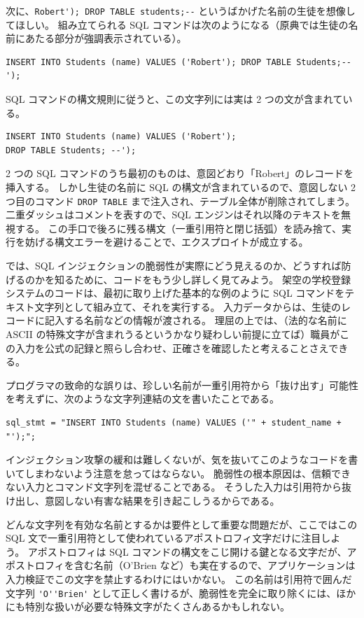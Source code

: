 \documentclass[uplatex]{jsarticle}
\begin{document}
次に、\verb|Robert'); DROP TABLE students;--| というばかげた名前の生徒を想像してほしい。
組み立てられる SQL コマンドは次のようになる（原典では生徒の名前にあたる部分が強調表示されている）。
\begin{verbatim}
INSERT INTO Students (name) VALUES ('Robert'); DROP TABLE Students;--');
\end{verbatim}
SQL コマンドの構文規則に従うと、この文字列には実は 2 つの文が含まれている。
\begin{verbatim}
INSERT INTO Students (name) VALUES ('Robert');
DROP TABLE Students; --');
\end{verbatim}
2 つの SQL コマンドのうち最初のものは、意図どおり「Robert」のレコードを挿入する。
しかし生徒の名前に SQL の構文が含まれているので、意図しない 2 つ目のコマンド \texttt{DROP TABLE} まで注入され、テーブル全体が削除されてしまう。
二重ダッシュはコメントを表すので、SQL エンジンはそれ以降のテキストを無視する。
この手口で後ろに残る構文（一重引用符と閉じ括弧）を読み捨て、実行を妨げる構文エラーを避けることで、エクスプロイトが成立する。

では、SQL インジェクションの脆弱性が実際にどう見えるのか、どうすれば防げるのかを知るために、コードをもう少し詳しく見てみよう。
架空の学校登録システムのコードは、最初に取り上げた基本的な例のように SQL コマンドをテキスト文字列として組み立て、それを実行する。
入力データからは、生徒のレコードに記入する名前などの情報が渡される。
理屈の上では、（法的な名前に ASCII の特殊文字が含まれうるというかなり疑わしい前提に立てば）職員がこの入力を公式の記録と照らし合わせ、正確さを確認したと考えることさえできる。

プログラマの致命的な誤りは、珍しい名前が一重引用符から「抜け出す」可能性を考えずに、次のような文字列連結の文を書いたことである。
\begin{verbatim}
sql_stmt = "INSERT INTO Students (name) VALUES ('" + student_name + "');";
\end{verbatim}
インジェクション攻撃の緩和は難しくないが、気を抜いてこのようなコードを書いてしまわないよう注意を怠ってはならない。
脆弱性の根本原因は、信頼できない入力とコマンド文字列を混ぜることである。
そうした入力は引用符から抜け出し、意図しない有害な結果を引き起こしうるからである。

どんな文字列を有効な名前とするかは要件として重要な問題だが、ここではこの SQL 文で一重引用符として使われているアポストロフィ文字だけに注目しよう。
アポストロフィは SQL コマンドの構文をこじ開ける鍵となる文字だが、アポストロフィを含む名前（O'Brien など）も実在するので、アプリケーションは入力検証でこの文字を禁止するわけにはいかない。
この名前は引用符で囲んだ文字列 \verb|'O''Brien'| として正しく書けるが、脆弱性を完全に取り除くには、ほかにも特別な扱いが必要な特殊文字がたくさんあるかもしれない。
\end{document}
